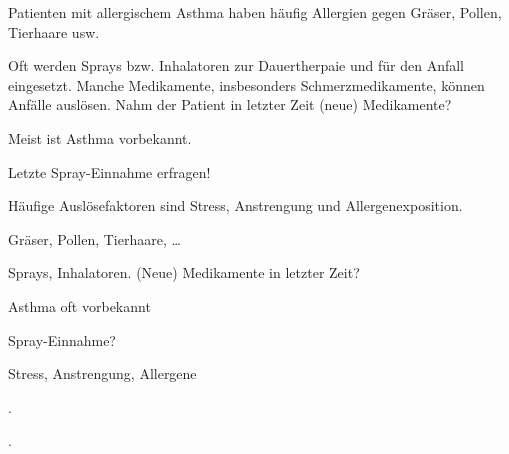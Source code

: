 \documentclass[
ngerman,
paper=a4,
asymmetric,
fontsize=10pt,
draft=false,
numbers=noenddot,
bibtotocnumbered,
footnotes=multiple,
]{scrreprt}
\newcommand{\jALT}{\vspace{6pt}\noindent{\color{red}\sffamily\textbf{DELETED}\hrulefill\newline}}
\newcommand{\jALTende}{\newline{\color{red}\rule{\linewidth}{2pt}\newline}}
\newcommand{\jNEU}{\vspace{6pt}\noindent{\color{green}\sffamily\textbf{ADDED}\hrulefill\newline}}
\newcommand{\jNEUende}{\newline{\color{green}\rule{\linewidth}{3pt}\newline}}
\begin{document}
 \jNEU
 {{\TxSAMPLER}}
{%
 \begin{SAMPLERText}
  \item[\SAMPLER{A}] Patienten mit allergischem Asthma haben
  häufig Allergien gegen Gräser, Pollen, Tierhaare usw.
  \item[\SAMPLER{M}] Oft werden Sprays bzw. Inhalatoren zur
  Dauertherpaie und für den Anfall eingesetzt. Manche
  Medikamente, insbesonders Schmerzmedikamente, können
  Anfälle auslösen.%
  Nahm der Patient in letzter Zeit (neue)
  Medikamente?
  \item[\SAMPLER{P}] Meist ist Asthma vorbekannt. 
  \item[\SAMPLER{L}] Letzte Spray-Einnahme erfragen!
  \item[\SAMPLER{E}] Häufige Auslösefaktoren sind Stress,
  Anstrengung und Allergenexposition.
 \end{SAMPLERText}
 }
 {
 \begin{SAMPLERSlide}
  \item[\SAMPLER{A}] Gräser, Pollen, Tierhaare, \ldots
  \item[\SAMPLER{M}] Sprays, Inhalatoren. (Neue) Medikamente in letzter Zeit?
  \item[\SAMPLER{P}] Asthma oft vorbekannt
  \item[\SAMPLER{L}] Spray-Einnahme?
  \item[\SAMPLER{E}] Stress, Anstrengung, Allergene
 \end{SAMPLERSlide}
 }
 {}
 {}
 {}
 .
 \jNEUende
 
 \jALT
 .
 \jALTende
 
\end{document}
